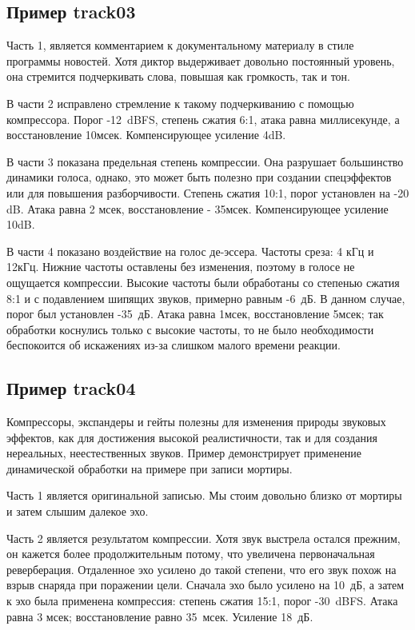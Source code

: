 \documentclass[oneside, final, 14pt]{extreport}
\begin{document}
\subsection{Пример track03}
Часть 1, является комментарием к документальному материалу в стиле программы новостей. Хотя диктор выдерживает довольно постоянный уровень, она стремится подчеркивать слова, повышая как громкость, так и тон.

В части 2 исправлено стремление к такому подчеркиванию с помощью компрессора. Порог -12~dBFS, степень сжатия 6:1, атака равна миллисекунде, а восстановление 10мсек. Компенсирующее усиление 4dB.

В части 3 показана предельная степень компрессии. Она разрушает большинство динамики голоса, однако, это может быть полезно при создании спецэффектов или для повышения разборчивости. Степень сжатия 10:1, порог установлен на -20 dB. Атака равна 2 мсек, восстановление - 35мсек. Компенсирующее усиление 10dB.

В части 4 показано воздействие на голос де-эссера. Частоты среза: 4 кГц и 12кГц. Нижние частоты оставлены без изменения, поэтому в голосе не ощущается компрессии. Высокие частоты были обработаны со степенью сжатия 8:1 и с подавлением шипящих звуков, примерно равным -6~дБ. В данном случае, порог был установлен -35~дБ. Атака равна 1мсек, восстановление 5мсек; так обработки коснулись только с высокие частоты, то не было необходимости беспокоится об искажениях из-за слишком малого времени реакции.

\subsection{Пример track04}
Компрессоры, экспандеры и гейты полезны для изменения природы звуковых эффектов, как для достижения высокой реалистичности, так и для создания нереальных, неестественных звуков. Пример демонстрирует применение динамической обработки на примере при записи мортиры.

Часть 1 является оригинальной записью. Мы стоим довольно близко от мортиры и затем слышим далекое эхо.

Часть 2 является результатом компрессии. Хотя звук выстрела остался прежним, он кажется более продолжительным потому, что увеличена первоначальная реверберация. Отдаленное эхо усилено до такой степени, что его звук похож на взрыв снаряда при поражении цели. Сначала эхо было усилено на 10~дБ, а затем к эхо была применена компрессия: степень сжатия 15:1, порог -30~dBFS. Атака равна 3 мсек; восстановление равно 35~мсек. Усиление 18~дБ.
\end{document}
